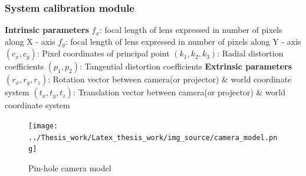 \documentclass[9pt]{beamer}
\begin{document}
\begin{frame}
\frametitle{System calibration module}
\textbf{Intrinsic parameters}\newline  
$f_x$: focal length of lens expressed in number of pixels along X - axis\newline  
$f_y$: focal length of lens expressed in number of pixels along Y - axis\newline  
$(c_x , c_y)$: Pixel coordinates of principal point\newline  
$(k_1, k_2, k_3)$: Radial distortion coefficients\newline  
$(p_1,p_2)$: Tangential distortion coefficients\newline  
\textbf{Extrinsic parameters}\newline  
$(r_x,r_y,r_z)$: Rotation vector between camera(or projector) \& world coordinate system\newline  
$(t_x,t_y,t_z)$: Translation vector between camera(or projector) \& world coordinate system 
\begin{figure}
\texttt{[image: ../Thesis\_work/Latex\_thesis\_work/img\_source/camera\_model.png]}
\caption{Pin-hole camera model}
\end{figure}
\end{frame}
\end{document}
